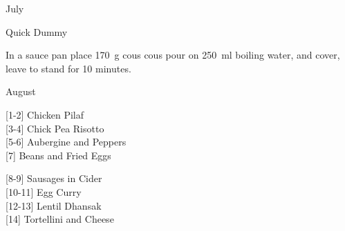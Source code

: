 \begin{menu}{July}
\begin{recipe}{1}{Quick Dummy}
\begin{ingredients}
		\end{ingredients}
	
	
    \begin{instructions}
    \item 
    In a
    sauce pan 
    place
    170~g  cous cous
    pour on
    250~ml  boiling water,
    and cover, leave to stand for 10 minutes.
  
    \end{instructions}
    \end{recipe}%
  
    \clearpage
    \end{menu}
	
		\begin{menu}{August}
    
    \begin{recipelist}
    
        {\scriptsize[1-2]} Chicken Pilaf\\
        {\scriptsize[3-4]} Chick Pea Risotto\\
        {\scriptsize[5-6]} Aubergine and Peppers\\
        {\scriptsize[7]} Beans and Fried Eggs\\%
    \end{recipelist}%
    \begin{recipelist}
    
        {\scriptsize[8-9]} Sausages in Cider\\
        {\scriptsize[10-11]} Egg Curry\\
        {\scriptsize[12-13]} Lentil Dhansak\\
        {\scriptsize[14]} Tortellini and Cheese\\%
    \end{recipelist}\par%
  

\end{menu}
